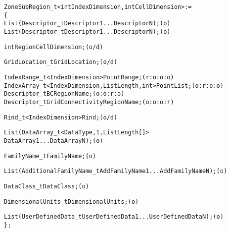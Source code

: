 \begin{alltt}
  ZoneSubRegion\_t< int IndexDimension, int CellDimension > :=
    \{
    List( Descriptor\_t Descriptor1 ... DescriptorN ) ;                      (o)
    List( Descriptor\_t Descriptor1 ... DescriptorN ) ;                      (o)

    int RegionCellDimension ;                                               (o/d)

    GridLocation\_t GridLocation ;                                           (o/d)

    IndexRange\_t<IndexDimension> PointRange ;                               (r:o:o:o)
    IndexArray\_t<IndexDimension, ListLength, int> PointList ;               (o:r:o:o)
    Descriptor\_t BCRegionName ;                                             (o:o:r:o)
    Descriptor\_t GridConnectivityRegionName ;                               (o:o:o:r)

    Rind\_t<IndexDimension> Rind;                                            (o/d)

    List( DataArray\_t<DataType, 1, ListLength[]> 
          DataArray1 ... DataArrayN ) ;                                     (o)

    FamilyName\_t FamilyName ;                                               (o)

    List( AdditionalFamilyName\_t AddFamilyName1 ... AddFamilyNameN ) ;      (o)

    DataClass\_t DataClass ;                                                 (o)

    DimensionalUnits\_t DimensionalUnits ;                                   (o)

    List( UserDefinedData\_t UserDefinedData1 ... UserDefinedDataN ) ;       (o)
    \} ;
\end{alltt}

